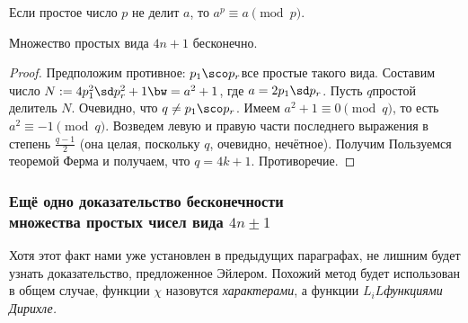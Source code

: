 \documentclass[a4paper]{article}
\begin{document}
\begin{imp}
Если простое число $p$ не делит $a$, то $a^p\equiv a\pmod{p}$.
\end{imp}

\begin{stm}
Множество простых вида $4n+1$ бесконечно.
\end{stm}
\begin{proof}
Предположим противное: $p_1\sco p_r$\т  все простые такого вида. Составим число
$N:=4p_1^2\sd p_r^2+1\bw=a^2+1$, где $a=2p_1\sd p_r$. Пусть $q$\т простой делитель $N$. Очевидно, что
$q\neq p_1\sco p_r$. Имеем $a^2+1\equiv 0 \pmod{q}$, то есть $a^2\equiv-1\pmod{q}$. Возведем левую и правую части
последнего выражения в степень $\frac{q-1}{2}$ (она целая, поскольку $q$, очевидно, нечётное). Получим
Пользуемся теоремой Ферма и получаем, что $q=4k+1$. Противоречие.
\end{proof}

\subsubsection{Ещё одно доказательство бесконечности\\множества простых чисел вида $4n\pm1$}

Хотя этот факт нами уже установлен в предыдущих параграфах, не лишним будет узнать доказательство,
предложенное Эйлером. Похожий метод будет использован в общем случае, функции $\chi$ назовутся \emph{характерами},
а функции $L_i$\т \emph{$L$\д функциями Дирихле.}
\end{document}
